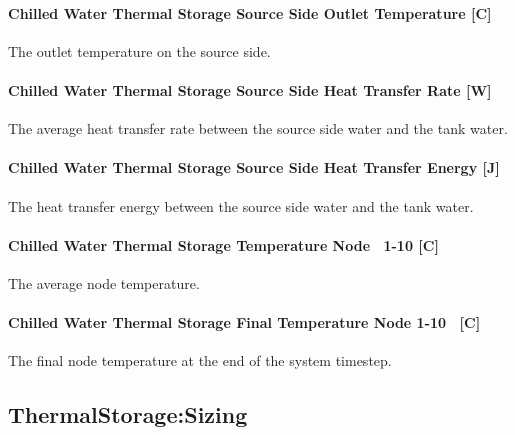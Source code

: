 \paragraph{Chilled Water Thermal Storage Source Side Outlet Temperature {[}C{]}}\label{chilled-water-thermal-storage-source-side-outlet-temperature-c-1}

The outlet temperature on the source side.

\paragraph{Chilled Water Thermal Storage Source Side Heat Transfer Rate {[}W{]}}\label{chilled-water-thermal-storage-source-side-heat-transfer-rate-w-1}

The average heat transfer rate between the source side water and the tank water.

\paragraph{Chilled Water Thermal Storage Source Side Heat Transfer Energy {[}J{]}}\label{chilled-water-thermal-storage-source-side-heat-transfer-energy-j-1}

The heat transfer energy between the source side water and the tank water.

\paragraph{Chilled Water Thermal Storage Temperature Node~ 1-10 {[}C{]}}\label{chilled-water-thermal-storage-temperature-node-1-10-c}

The average node temperature.

\paragraph{Chilled Water Thermal Storage Final Temperature Node 1-10~ {[}C{]}}\label{chilled-water-thermal-storage-final-temperature-node-1-10-c}

The final node temperature at the end of the system timestep.

\subsection{ThermalStorage:Sizing}\label{thermalstoragesizing}


